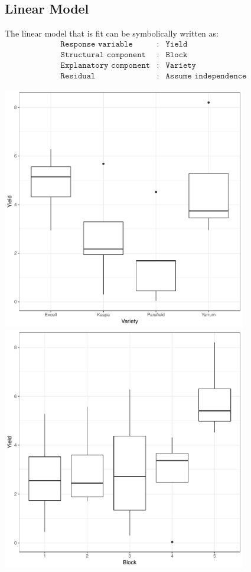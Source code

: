 \documentclass[a4paper, 10pt, fleqn, twosided]{memoir}
\begin{document}
\subsection{Linear Model}
The linear model that is fit can be symbolically written as:
\begin{eqnarray*}
	\texttt{Response variable}&:& \texttt{Yield} \\
	\texttt{Structural component}&:& \texttt{Block}\\
	\texttt{Explanatory component}&:& \texttt{Variety}\\
	\texttt{Residual}&:& \texttt{Assume independence}
\end{eqnarray*}


\begin{tcolorbox}[title = Example 3 Boxplots of Yield]
\includegraphics[width=0.8\textwidth, frame]{example3Var_boxplot.pdf}
\tcblower
\includegraphics[width=0.8\textwidth, frame]{example3Blk_boxplot.pdf}
\end{tcolorbox}
\end{document}
